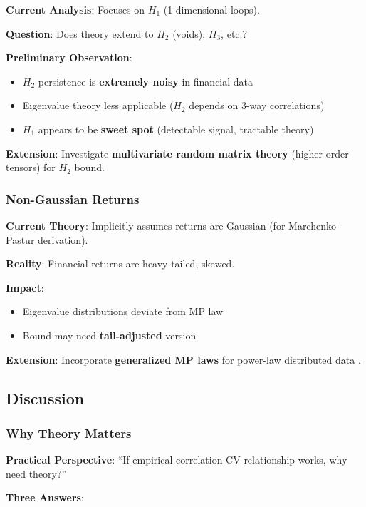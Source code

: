 \textbf{Current Analysis}: Focuses on $H_1$ (1-dimensional loops).

\textbf{Question}: Does theory extend to $H_2$ (voids), $H_3$, etc.?

\textbf{Preliminary Observation}:
\begin{itemize}
\item $H_2$ persistence is \textbf{extremely noisy} in financial data
\item Eigenvalue theory less applicable ($H_2$ depends on 3-way correlations)
\item $H_1$ appears to be \textbf{sweet spot} (detectable signal, tractable theory)
\end{itemize}

\textbf{Extension}: Investigate \textbf{multivariate random matrix theory} (higher-order tensors) for $H_2$ bound.

\subsubsection{Non-Gaussian Returns}

\textbf{Current Theory}: Implicitly assumes returns are Gaussian (for Marchenko-Pastur derivation).

\textbf{Reality}: Financial returns are heavy-tailed, skewed.

\textbf{Impact}:
\begin{itemize}
\item Eigenvalue distributions deviate from MP law
\item Bound may need \textbf{tail-adjusted} version
\end{itemize}

\textbf{Extension}: Incorporate \textbf{generalized MP laws} for power-law distributed data \citep{Burda2004}.

\subsection{Discussion}

\subsubsection{Why Theory Matters}

\textbf{Practical Perspective}: ``If empirical correlation-CV relationship works, why need theory?''

\textbf{Three Answers}:

